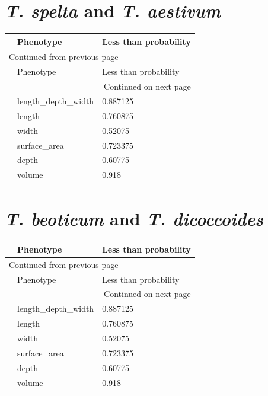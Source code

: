 \documentclass[11pt]{report}
\begin{document}
\section{\emph{T. spelta} and \emph{T. aestivum}}
\label{sec:orgdaf7a35}
\begin{longtable}{l|l|l}
 & Phenotype & Less than probability\\
\hline
\endfirsthead
\multicolumn{3}{l}{Continued from previous page} \\
\hline

 & Phenotype & Less than probability \\

\hline
\endhead
\hline\multicolumn{3}{r}{Continued on next page} \\
\endfoot
\endlastfoot
\hline
 & length\_depth\_width & 0.887125\\
 & length & 0.760875\\
 & width & 0.52075\\
 & surface\_area & 0.723375\\
 & depth & 0.60775\\
 & volume & 0.918\\
\end{longtable}


\clearpage
\section{\emph{T. beoticum} and \emph{T. dicoccoides}}
\label{sec:org73dc7ba}
\begin{longtable}{l|l|l}
 & Phenotype & Less than probability\\
\hline
\endfirsthead
\multicolumn{3}{l}{Continued from previous page} \\
\hline

 & Phenotype & Less than probability \\

\hline
\endhead
\hline\multicolumn{3}{r}{Continued on next page} \\
\endfoot
\endlastfoot
\hline
 & length\_depth\_width & 0.887125\\
 & length & 0.760875\\
 & width & 0.52075\\
 & surface\_area & 0.723375\\
 & depth & 0.60775\\
 & volume & 0.918\\
\end{longtable}
\end{document}
